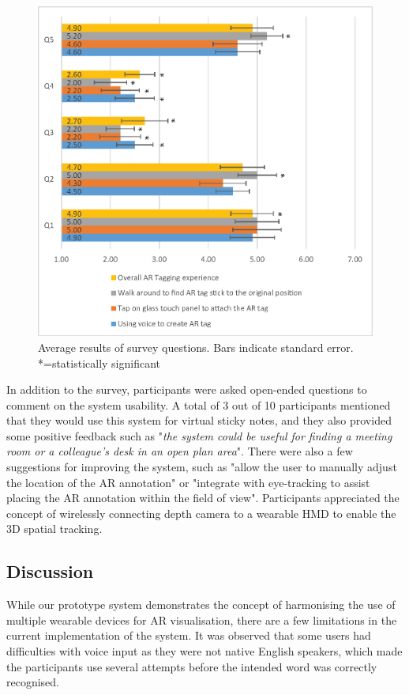 \begin{figure}[ht]
  \centering
  \includegraphics[width=\linewidth]{images/62-3d-mgia15/user_study_results2.eps}
  \caption{Average results of survey questions. Bars indicate standard error. *=statistically significant}
    \label{survey_results}
\end{figure}

In addition to the survey, participants were asked open-ended questions to comment on the system usability. A total of 3 out of 10 participants mentioned that they would use this system for virtual sticky notes, and they also provided some positive feedback such as "\textit{the system could be useful for finding a meeting room or a colleague's desk in an open plan area}". There were also a few suggestions for improving the system, such as "allow the user to manually adjust the location of the AR annotation" or "integrate with eye-tracking to assist placing the AR annotation within the field of view". Participants appreciated the concept of wirelessly connecting depth camera to a wearable HMD to enable the 3D spatial tracking.    

\subsection{Discussion}

While our prototype system demonstrates the concept of harmonising the use of multiple wearable devices for AR visualisation, there are a few limitations in the current implementation of the system. It was observed that some users had difficulties with voice input as they were not native English speakers, which made the participants use several attempts before the intended word was correctly recognised.  

